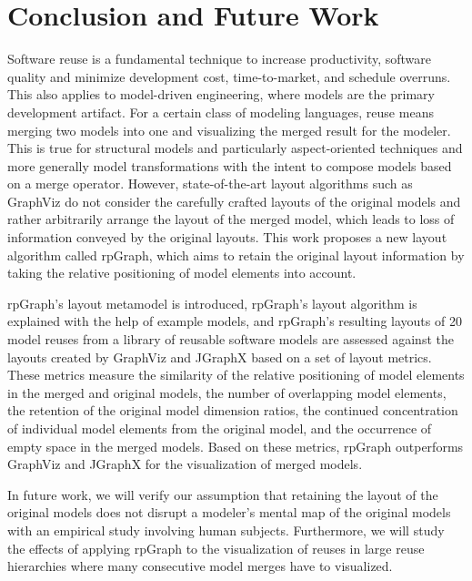 \section{Conclusion and Future Work}\label{conclusion}
Software reuse is a fundamental technique to increase productivity, software quality and minimize development cost, time-to-market, and schedule overruns. This also applies to model-driven engineering, where models are the primary development artifact. For a certain class of modeling languages, reuse means merging two models into one and visualizing the merged result for the modeler. This is true for structural models and particularly aspect-oriented techniques and more generally model transformations with the intent to compose models based on a merge operator. However, state-of-the-art layout algorithms such as GraphViz do not consider the carefully crafted layouts of the original models and rather arbitrarily arrange the layout of the merged model, which leads to loss of information conveyed by the original layouts. This work proposes a new layout algorithm called rpGraph, which aims to retain the original layout information by taking the relative positioning of model elements into account.

rpGraph's layout metamodel is introduced, rpGraph's layout algorithm is explained with the help of example models, and rpGraph's resulting layouts of 20 model reuses from a library of reusable software models are assessed against the layouts created by GraphViz and JGraphX based on a set of layout metrics. These metrics measure the similarity of the relative positioning of model elements in the merged and original models, the number of overlapping model elements, the retention of the original model dimension ratios, the continued concentration of individual model elements from the original model, and the occurrence of empty space in the merged models. Based on these metrics, rpGraph outperforms GraphViz and JGraphX for the visualization of merged models.

In future work, we will verify our assumption that retaining the layout of the original models does not disrupt a modeler's mental map of the original models with an empirical study involving human subjects. Furthermore, we will study the effects of applying rpGraph to the visualization of reuses in large reuse hierarchies where many consecutive model merges have to visualized.

